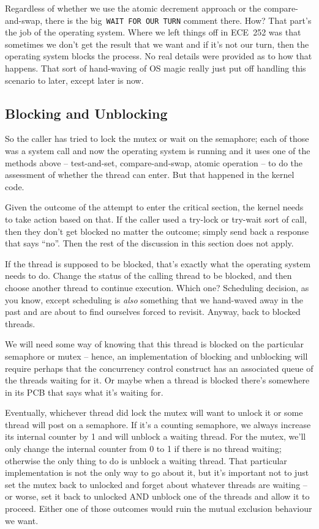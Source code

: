 Regardless of whether we use the atomic decrement approach or the compare-and-swap, there is the big~\texttt{WAIT FOR OUR TURN} comment there. How? That part's the job of the operating system. Where we left things off in ECE~252 was that sometimes we don't get the result that we want and if it's not our turn, then the operating system blocks the process. No real details were provided as to how that happens. That sort of hand-waving of OS magic really just put off handling this scenario to later, except later is now.

\subsection*{Blocking and Unblocking}

So the caller has tried to lock the mutex or wait on the semaphore; each of those was a system call and now the operating system is running and it uses one of the methods above -- test-and-set, compare-and-swap, atomic operation -- to do the assessment of whether the thread can enter. But that happened in the kernel code.

Given the outcome of the attempt to enter the critical section, the kernel needs to take action based on that. If the caller used a try-lock or try-wait sort of call, then they don't get blocked no matter the outcome; simply send back a response that says ``no''. Then the rest of the discussion in this section does not apply.

If the thread is supposed to be blocked, that's exactly what the operating system needs to do. Change the status of the calling thread to be blocked, and then choose another thread to continue execution. Which one? Scheduling decision, as you know, except scheduling is \textit{also} something that we hand-waved away in the past and are about to find ourselves forced to revisit. Anyway, back to blocked threads.

We will need some way of knowing that this thread is blocked on the particular semaphore or mutex -- hence, an implementation of blocking and unblocking will require perhaps that the concurrency control construct has an associated queue of the threads waiting for it. Or maybe when a thread is blocked there's somewhere in its PCB that says what it's waiting for. 

Eventually, whichever thread did lock the mutex will want to unlock it or some thread will post on a semaphore. If it's a counting semaphore, we always increase its internal counter by 1 and will unblock a waiting thread. For the mutex, we'll only change the internal counter from 0 to 1 if there is no thread waiting; otherwise the only thing to do is unblock a waiting thread. That particular implementation is not the only way to go about it, but it's important not to just set the mutex back to unlocked and forget about whatever threads are waiting -- or worse, set it back to unlocked AND unblock one of the threads and allow it to proceed. Either one of those outcomes would ruin the mutual exclusion behaviour we want.

